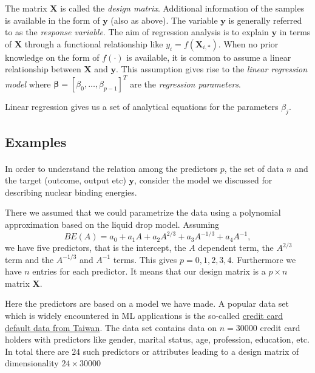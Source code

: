 \documentclass[%
oneside,                 %
final,                   %
10pt]{article}
\begin{document}
The matrix $\mathbf{X}$ is called the \emph{design
matrix}. Additional information of the samples is available in the
form of $\bm{y}$ (also as above). The variable $\bm{y}$ is
generally referred to as the \emph{response variable}. The aim of
regression analysis is to explain $\bm{y}$ in terms of
$\bm{X}$ through a functional relationship like $y_i =
f(\mathbf{X}_{i,\ast})$. When no prior knowledge on the form of
$f(\cdot)$ is available, it is common to assume a linear relationship
between $\bm{X}$ and $\bm{y}$. This assumption gives rise to
the \emph{linear regression model} where $\bm{\beta} = [\beta_0, \ldots,
\beta_{p-1}]^{T}$ are the \emph{regression parameters}. 

Linear regression gives us a set of analytical equations for the parameters $\beta_j$.





\subsection{Examples}

\paragraph{}
In order to understand the relation among the predictors $p$, the set of data $n$ and the target (outcome, output etc) $\bm{y}$,
consider the model we discussed for describing nuclear binding energies. 

There we assumed that we could parametrize the data using a polynomial approximation based on the liquid drop model.
Assuming 
\[
BE(A) = a_0+a_1A+a_2A^{2/3}+a_3A^{-1/3}+a_4A^{-1},
\]
we have five predictors, that is the intercept, the $A$ dependent term, the $A^{2/3}$ term and the $A^{-1/3}$ and $A^{-1}$ terms.
This gives $p=0,1,2,3,4$. Furthermore we have $n$ entries for each predictor. It means that our design matrix is a 
$p\times n$ matrix $\bm{X}$.

Here the predictors are based on a model we have made. A popular data set which is widely encountered in ML applications is the
so-called \href{{https://www.sciencedirect.com/science/article/pii/S0957417407006719?via%
\end{document}

